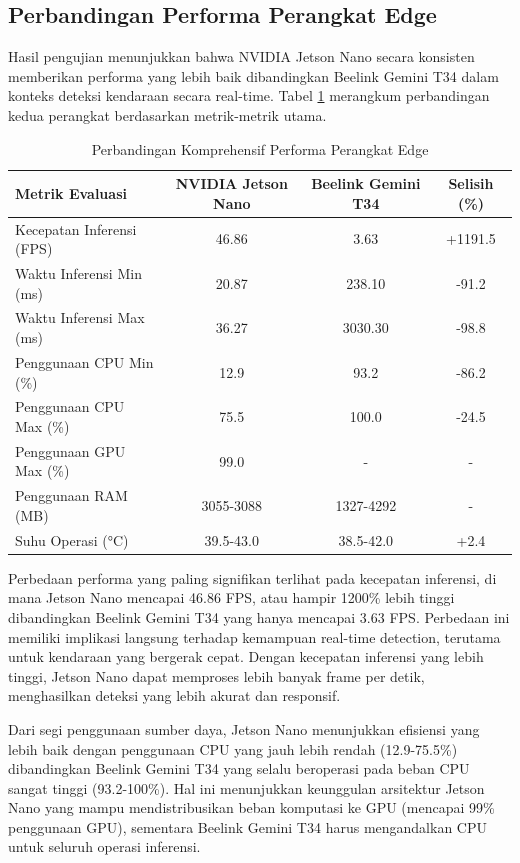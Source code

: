 \subsection{Perbandingan Performa Perangkat Edge}

Hasil pengujian menunjukkan bahwa NVIDIA Jetson Nano secara konsisten memberikan performa yang lebih baik dibandingkan Beelink Gemini T34 dalam konteks deteksi kendaraan secara real-time. Tabel \ref{tab:perangkat_comparison} merangkum perbandingan kedua perangkat berdasarkan metrik-metrik utama.

\begin{table}[htbp]
  \centering
  \setlength{\tabcolsep}{4pt}
  \small
  \begin{tabular}{|l|c|c|c|}
  \hline
  \rowcolor[HTML]{C0C0C0}
  \textbf{Metrik Evaluasi} & \textbf{NVIDIA Jetson Nano} & \textbf{Beelink Gemini T34} & \textbf{Selisih (\%)} \\
  \hline
  Kecepatan Inferensi (FPS) & 46.86 & 3.63 & +1191.5 \\
  \hline
  Waktu Inferensi Min (ms) & 20.87 & 238.10 & -91.2 \\
  \hline
  Waktu Inferensi Max (ms) & 36.27 & 3030.30 & -98.8 \\
  \hline
  Penggunaan CPU Min (\%) & 12.9 & 93.2 & -86.2 \\
  \hline
  Penggunaan CPU Max (\%) & 75.5 & 100.0 & -24.5 \\
  \hline
  Penggunaan GPU Max (\%) & 99.0 & - & - \\
  \hline
  Penggunaan RAM (MB) & 3055-3088 & 1327-4292 & - \\
  \hline
  Suhu Operasi (°C) & 39.5-43.0 & 38.5-42.0 & +2.4 \\
  \hline
  \end{tabular}
  \caption{Perbandingan Komprehensif Performa Perangkat Edge}
  \label{tab:perangkat_comparison}
\end{table}

Perbedaan performa yang paling signifikan terlihat pada kecepatan inferensi, di mana Jetson Nano mencapai 46.86 FPS, atau hampir 1200\% lebih tinggi dibandingkan Beelink Gemini T34 yang hanya mencapai 3.63 FPS. Perbedaan ini memiliki implikasi langsung terhadap kemampuan real-time detection, terutama untuk kendaraan yang bergerak cepat. Dengan kecepatan inferensi yang lebih tinggi, Jetson Nano dapat memproses lebih banyak frame per detik, menghasilkan deteksi yang lebih akurat dan responsif.

Dari segi penggunaan sumber daya, Jetson Nano menunjukkan efisiensi yang lebih baik dengan penggunaan CPU yang jauh lebih rendah (12.9-75.5\%) dibandingkan Beelink Gemini T34 yang selalu beroperasi pada beban CPU sangat tinggi (93.2-100\%). Hal ini menunjukkan keunggulan arsitektur Jetson Nano yang mampu mendistribusikan beban komputasi ke GPU (mencapai 99\% penggunaan GPU), sementara Beelink Gemini T34 harus mengandalkan CPU untuk seluruh operasi inferensi.

